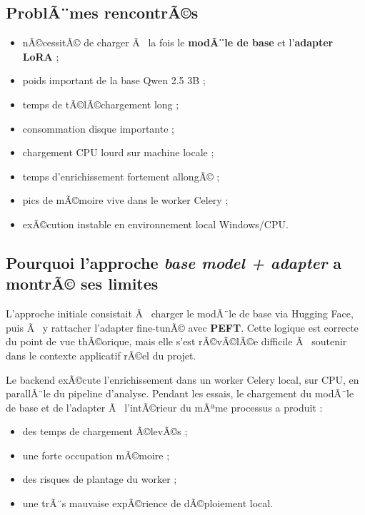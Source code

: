 ﻿\documentclass[12pt,a4paper]{article}
\begin{document}
\subsection{ProblÃ¨mes rencontrÃ©s}
\begin{itemize}
    \item nÃ©cessitÃ© de charger Ã  la fois le \textbf{modÃ¨le de base} et l'\textbf{adapter LoRA} ;
    \item poids important de la base Qwen 2.5 3B ;
    \item temps de tÃ©lÃ©chargement long ;
    \item consommation disque importante ;
    \item chargement CPU lourd sur machine locale ;
    \item temps d'enrichissement fortement allongÃ© ;
    \item pics de mÃ©moire vive dans le worker Celery ;
    \item exÃ©cution instable en environnement local Windows/CPU.
\end{itemize}

\subsection{Pourquoi l'approche \textit{base model + adapter} a montrÃ© ses limites}
L'approche initiale consistait Ã  charger le modÃ¨le de base via Hugging Face, puis Ã  y rattacher l'adapter fine-tunÃ© avec \textbf{PEFT}. Cette logique est correcte du point de vue thÃ©orique, mais elle s'est rÃ©vÃ©lÃ©e difficile Ã  soutenir dans le contexte applicatif rÃ©el du projet.

Le backend exÃ©cute l'enrichissement dans un worker Celery local, sur CPU, en parallÃ¨le du pipeline d'analyse. Pendant les essais, le chargement du modÃ¨le de base et de l'adapter Ã  l'intÃ©rieur du mÃªme processus a produit :
\begin{itemize}
    \item des temps de chargement Ã©levÃ©s ;
    \item une forte occupation mÃ©moire ;
    \item des risques de plantage du worker ;
    \item une trÃ¨s mauvaise expÃ©rience de dÃ©ploiement local.
\end{itemize}
\end{document}
